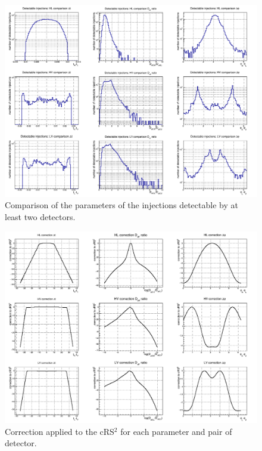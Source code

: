 
\begin{figure}
  \centering
  \includegraphics[width=\linewidth]{sectionMBTA/cInjDoub.png}
  \caption{Comparison of the parameters of the injections detectable by at least two detectors.}
  \label{fig:pct_inj_selec}
\end{figure}

\begin{figure}
  \centering
  \includegraphics[width=\linewidth]{sectionMBTA/cPCT.png}
  \caption{Correction applied to the cRS$^2$ for each parameter and pair of detector.}
  \label{fig:pct_correc}
\end{figure}

